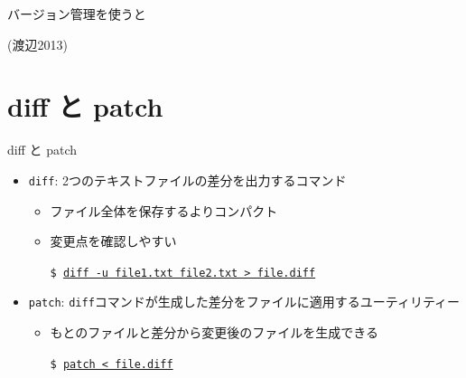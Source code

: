\documentclass[10pt,dvipdfmx]{beamer}
\begin{document}
\begin{frame}[t,fragile]{バージョン管理を使うと}
  \vspace*{-1.8em}
  \begin{center}
  \end{center}
  \vspace*{-2em}
  {\footnotesize (渡辺2013)}
\end{frame}

\section{diff と patch}

\begin{frame}[t,fragile]{diff と patch}
  \begin{itemize}
    \setlength{\itemsep}{1em}
  \item {\tt diff}: 2つのテキストファイルの差分を出力するコマンド
    \begin{itemize}
    \item ファイル全体を保存するよりコンパクト
    \item 変更点を確認しやすい
      
      {\tt \$ \underline{diff -u file1.txt file2.txt > file.diff}}
    \end{itemize}
  \item {\tt patch}: {\tt diff}コマンドが生成した差分をファイルに適用するユーティリティー
    \begin{itemize}
    \item もとのファイルと差分から変更後のファイルを生成できる

      {\tt \$ \underline{patch < file.diff}}
    \end{itemize}
  \end{itemize}
\end{frame}
\end{document}

